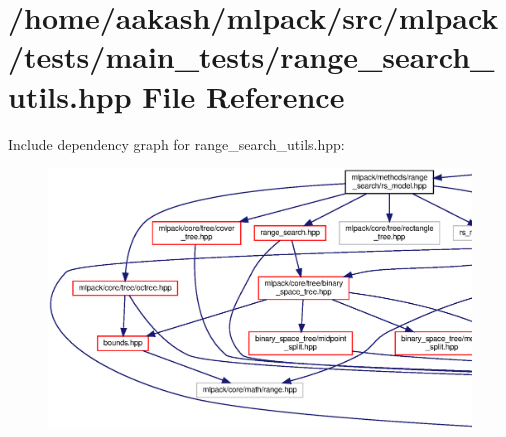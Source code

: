 \section{/home/aakash/mlpack/src/mlpack/tests/main\+\_\+tests/range\+\_\+search\+\_\+utils.hpp File Reference}
\label{range__search__utils_8hpp}
Include dependency graph for range\+\_\+search\+\_\+utils.\+hpp\+:
\nopagebreak
\begin{figure}[H]
\begin{center}
\leavevmode
\includegraphics[width=350pt]{range__search__utils_8hpp__incl}
\end{center}
\end{figure}
